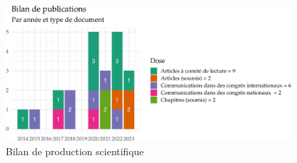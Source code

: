 \documentclass[
  11pt,
]{article}
\begin{document}
\begin{figure}[H]

{\centering \includegraphics[width=0.95\textwidth,height=\textheight]{Figures/fig-bilan-1.pdf}

}

\caption{\label{fig-bilan}Bilan de production scientifique}

\end{figure}
\end{document}
